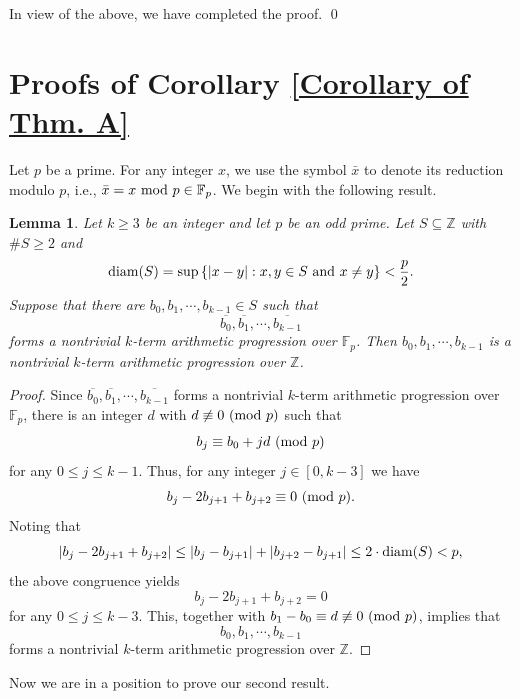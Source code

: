 \documentclass[12pt]{amsart}
\def\diam{{\rm diam}}
\def\pmod #1{\ ({\rm{mod}}\ #1)}
\def\mod #1{\ {\rm mod}\ #1}
\theoremstyle{plain}
\newtheorem{lemma}{Lemma}
\theoremstyle{remark}
\begin{document}
	In view of the above, we have completed the proof. \qed 
	
	
	\section{Proofs of Corollary \ref{Corollary of Thm. A}}
	\setcounter{lemma}{0}
	\setcounter{theorem}{0}
	\setcounter{equation}{0}
	\setcounter{conjecture}{0}
	\setcounter{remark}{0}
	\setcounter{corollary}{0}
	
	Let $p$ be a prime. For any integer $x$, we use the symbol $\bar{x}$ to denote its reduction modulo $p$, i.e., $\bar{x}=x\mod{p}\in\mathbb{F}_p$. We begin with the following result.
	
	\begin{lemma}\label{Lem. lift mod p to Z}
		Let $k\ge3$ be an integer and let $p$ be an odd prime. Let $S\subseteq\mathbb{Z}$ with $\#S\ge2$ and 
		$$\diam(S)=\sup\left\{|x-y|: x,y\in S\ \text{and}\ x\neq y\right\}<\frac{p}{2}.$$
		Suppose that there are $b_0,b_1,\cdots,b_{k-1}\in S$ such that 
		$$\overline{b_0},\overline{b_1},\cdots,\overline{b_{k-1}}$$
		forms a nontrivial $k$-term arithmetic progression over $\mathbb{F}_p$. Then $b_0,b_1,\cdots,b_{k-1}$ is a nontrivial $k$-term arithmetic progression over $\mathbb{Z}$. 
	\end{lemma}
	
	\begin{proof}
		Since $\overline{b_0},\overline{b_1},\cdots,\overline{b_{k-1}}$ forms a nontrivial $k$-term arithmetic progression over $\mathbb{F}_p$, there is an integer $d$ with $d\not\equiv 0\pmod{p}$ such that 
		$$b_j\equiv b_0+jd\pmod{p}$$
		for any $0\le j\le k-1$. Thus, for any integer $j\in[0,k-3]$ we have 
		$$b_j-2b_{j+1}+b_{j+2}\equiv 0\pmod{p}.$$
		Noting that 
		$$\left|b_j-2b_{j+1}+b_{j+2}\right|\le \left|b_j-b_{j+1}\right|+\left|b_{j+2}-b_{j+1}\right|\le 2\cdot \diam(S)<p,$$
		the above congruence yields 
		$$b_j-2b_{j+1}+b_{j+2}=0$$
		for any $0\le j\le k-3$. This, together with $b_1-b_0\equiv d\not\equiv 0\pmod{p}$, implies that 
		$$b_0,b_1,\cdots,b_{k-1}$$ 
		forms a nontrivial $k$-term arithmetic progression over $\mathbb{Z}$. 
	\end{proof}
	
	Now we are in a position to prove our second result.
	
\end{document}
